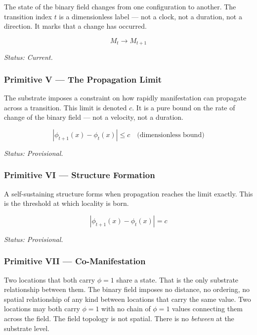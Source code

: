 \documentclass[11pt,letterpaper]{article}
\begin{document}
The state of the binary field changes from one configuration to another. The transition index \(t\) is a dimensionless label --- not a clock, not a duration, not a direction. It marks that a change has occurred.

\begin{equation}
M_t \to M_{t+1}
\end{equation}

\emph{Status: Current.}
\subsubsection{Primitive V --- The Propagation Limit}
\label{sec:org2f0925f}

The substrate imposes a constraint on how rapidly manifestation can propagate across a transition. This limit is denoted \(c\). It is a pure bound on the rate of change of the binary field --- not a velocity, not a duration.

\begin{equation}
|\phi_{t+1}(x) - \phi_t(x)| \leq c \quad \text{(dimensionless bound)}
\end{equation}

\emph{Status: Provisional.}
\subsubsection{Primitive VI --- Structure Formation}
\label{sec:org8346506}

A self-sustaining structure forms when propagation reaches the limit exactly. This is the threshold at which locality is born.

\begin{equation}
|\phi_{t+1}(x) - \phi_t(x)| = c
\end{equation}

\emph{Status: Provisional.}
\subsubsection{Primitive VII --- Co-Manifestation}
\label{sec:org01fe20f}

Two locations that both carry \(\phi = 1\) share a state. That is the only substrate relationship between them. The binary field imposes no distance, no ordering, no spatial relationship of any kind between locations that carry the same value. Two locations may both carry \(\phi = 1\) with no chain of \(\phi = 1\) values connecting them across the field. The field topology is not spatial. There is no \emph{between} at the substrate level.
\end{document}
